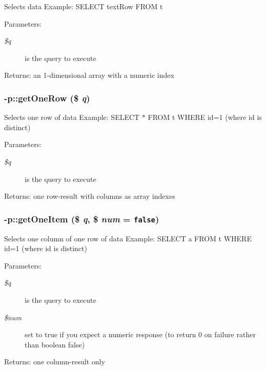 Selects data Example: SELECT textRow FROM t \begin{Desc}
\item[Parameters:]
\begin{description}
\item[{\em \$q}]is the query to execute \end{description}
\end{Desc}
\begin{Desc}
\item[Returns:]an 1-dimensional array with a numeric index \end{Desc}
\subsubsection{-p::getOneRow (\$ {\em q})\hspace{0.3cm}{\tt  [abstract]}}\label{protocolDB__Base-p_9f479057267a67da1265dd4c6323d186}


Selects one row of data Example: SELECT $\ast$ FROM t WHERE id=1 (where id is distinct) \begin{Desc}
\item[Parameters:]
\begin{description}
\item[{\em \$q}]is the query to execute \end{description}
\end{Desc}
\begin{Desc}
\item[Returns:]one row-result with columns as array indexes \end{Desc}
\subsubsection{-p::getOneItem (\$ {\em q}, \$ {\em num} = {\tt false})\hspace{0.3cm}{\tt  [abstract]}}\label{protocolDB__Base-p_5b10321095bce058a25fa19f18de2c03}


Selects one column of one row of data Example: SELECT a FROM t WHERE id=1 (where id is distinct) \begin{Desc}
\item[Parameters:]
\begin{description}
\item[{\em \$q}]is the query to execute \item[{\em \$num}]set to true if you expect a numeric response (to return 0 on failure rather than boolean false) \end{description}
\end{Desc}
\begin{Desc}
\item[Returns:]one column-result only \end{Desc}
